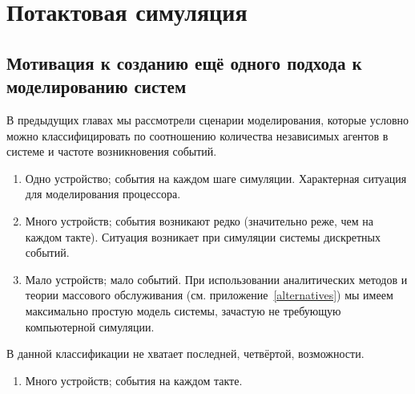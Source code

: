 
\chapter{Потактовая симуляция}\label{cycle}


\section[Мотивация]{Мотивация к созданию ещё одного подхода к моделированию систем}

В предыдущих главах мы рассмотрели сценарии моделирования, которые условно можно классифицировать по соотношению количества независимых агентов в системе и частоте возникновения событий.

\begin{enumerate}
    \item Одно устройство; события на каждом шаге симуляции. Характерная ситуация для моделирования процессора.
    \item Много устройств; события возникают редко (значительно реже, чем на каждом такте). Ситуация возникает при симуляции системы дискретных событий.
    \item Мало устройств; мало событий. При использовании аналитических методов и теории массового обслуживания (см. приложение~\ref{alternatives}) мы имеем максимально простую модель системы, зачастую не требующую компьютерной симуляции.
\end{enumerate}

В данной классификации не хватает последней, четвёртой, возможности.

\begin{enumerate}[resume] %
    \item Много устройств; события на каждом такте.
\end{enumerate}

